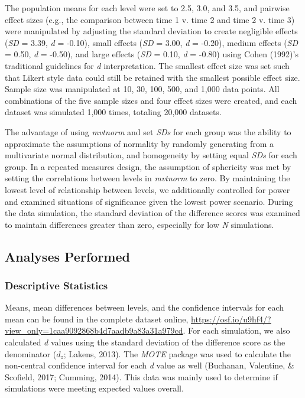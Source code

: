 \documentclass[,man, mask]{apa6}
\theoremstyle{definition}
\theoremstyle{definition}
\theoremstyle{definition}
\theoremstyle{remark}
\begin{document}
The population means for each level were set to 2.5, 3.0, and 3.5, and
pairwise effect sizes (e.g., the comparison between time 1 v. time 2 and
time 2 v. time 3) were manipulated by adjusting the standard deviation
to create negligible effects (\emph{SD} = 3.39, \emph{d} = -0.10), small
effects (\emph{SD} = 3.00, \emph{d} = -0.20), medium effects (\emph{SD}
= 0.50, \emph{d} = -0.50), and large effects (\emph{SD} = 0.10, \emph{d}
= -0.80) using Cohen (1992)'s traditional guidelines for \emph{d}
interpretation. The smallest effect size was set such that Likert style
data could still be retained with the smallest possible effect size.
Sample size was manipulated at 10, 30, 100, 500, and 1,000 data points.
All combinations of the five sample sizes and four effect sizes were
created, and each dataset was simulated 1,000 times, totaling 20,000
datasets.

The advantage of using \emph{mvtnorm} and set \emph{SDs} for each group
was the ability to approximate the assumptions of normality by randomly
generating from a multivariate normal distribution, and homogeneity by
setting equal \emph{SDs} for each group. In a repeated measures design,
the assumption of sphericity was met by setting the correlations between
levels in \emph{mvtnorm} to zero. By maintaining the lowest level of
relationship between levels, we additionally controlled for power and
examined situations of significance given the lowest power scenario.
During the data simulation, the standard deviation of the difference
scores was examined to maintain differences greater than zero,
especially for low \emph{N} simulations.

\subsection{Analyses Performed}\label{analyses-performed}

\subsubsection{Descriptive Statistics}\label{descriptive-statistics}

Means, mean differences between levels, and the confidence intervals for
each mean can be found in the complete dataset online,
\url{https://osf.io/u9hf4/?view_only=1caa9092868b4d7aadb9a83a31a979cd}.
For each simulation, we also calculated \emph{d} values using the
standard deviation of the difference score as the denominator
(\(d_{z}\); Lakens, 2013). The \emph{MOTE} package was used to calculate
the non-central confidence interval for each \emph{d} value as well
(Buchanan, Valentine, \& Scofield, 2017; Cumming, 2014). This data was
mainly used to determine if simulations were meeting expected values
overall.
\end{document}
